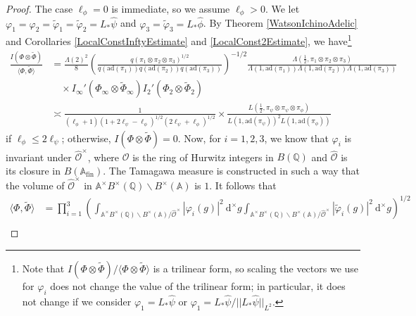 \documentclass[11pt]{amsart}
\theoremstyle{definition}
\begin{document}
\begin{proof} 
The case $\ell_{\phi}=0$ is immediate, so we assume $\ell_{\phi}>0$. We let $\varphi_1 = \varphi_2 = \widetilde{\varphi}_1 = \widetilde{\varphi}_2 = L_{*}\widehat{\psi}$ and $\varphi_3 = \widetilde{\varphi}_3 = L_{*}\widehat{\phi}$. By Theorem \ref{WatsonIchinoAdelic} and Corollaries \ref{LocalConstInftyEstimate} and \ref{LocalConst2Estimate}, we have\footnote{Note that $I(\Phi \otimes \widetilde{\Phi})/\langle \Phi \otimes \widetilde{\Phi}\rangle$ is a trilinear form, so scaling the vectors we use for $\varphi_i$ does not change the value of the trilinear form; in particular, it does not change if we consider $\varphi_1 = L_{*}\widehat{\psi}$ or $\varphi_1 = L_{*}\widehat{\psi} / ||L_{*}\widehat{\psi}||_{L^2}$.}
\begin{align}
    \frac{I(\Phi \otimes \widetilde{\Phi})}{\langle \Phi, \widetilde{\Phi} \rangle} &= \frac{\Lambda(2)^2}{8} \left( \frac{q(\pi_1 \otimes \pi_2 \otimes \pi_3)^{1/2}}{q(\mathrm{ad}(\pi_1)) q(\mathrm{ad}(\pi_2)) q(\mathrm{ad}(\pi_3))} \right)^{-1/2} \frac{\Lambda(\frac{1}{2}, \pi_1 \otimes \pi_2 \otimes \pi_3)}{\Lambda(1, \mathrm{ad}(\pi_1)) \Lambda(1, \mathrm{ad}(\pi_2)) \Lambda(1, \mathrm{ad}(\pi_3))} \label{WatsonIchinoClassical-eq1} \\
    &\quad \times I_{\infty}'(\Phi_{\infty} \otimes \widetilde{\Phi}_{\infty}) I_{2}'(\Phi_{2} \otimes \widetilde{\Phi}_{2}) \nonumber \\
    &\asymp \frac{1}{(\ell_{\phi}+1) (1+2\ell_{\psi} - \ell_{\phi})^{1/2}(2\ell_{\psi} + \ell_{\phi})^{1/2}} \times \frac{L(\frac{1}{2}, \pi_{\psi} \otimes \pi_{\psi} \otimes \pi_{\phi})}{L(1, \mathrm{ad}(\pi_{\psi}))^2 L(1, \mathrm{ad}(\pi_{\phi}))} \nonumber
\end{align} 
if $\ell_{\phi} \leq 2\ell_{\psi}$; otherwise, $I(\Phi \otimes \widetilde{\Phi})=0$. Now, for $i=1,2,3$, we know that $\varphi_i$ is invariant under $\widehat{\mathcal{O}}^{\times}$, where $\mathcal{O}$ is the ring of Hurwitz integers in $B(\mathbb{Q})$ and $\widehat{\mathcal{O}}$ is its closure in $B(\mathbb{A}_{\text{fin}})$. The Tamagawa measure is constructed in such a way that the volume of $\widehat{\mathcal{O}}^{\times}$ in $\mathbb{A}^{\times} B^{\times}(\mathbb{Q}) \backslash B^{\times}(\mathbb{A})$ is $1$. It follows that 
\begin{align*}
    \langle \Phi, \widetilde{\Phi} \rangle &= \prod_{i=1}^{3} \left( \int_{\mathbb{A}^{\times} B^{\times}(\mathbb{Q}) \backslash B^{\times}(\mathbb{A}) / \widehat{\mathcal{O}}^{\times}} |\varphi_{i}(g)|^2 \: \mathrm{d}^{\times}g \int_{\mathbb{A}^{\times} B^{\times}(\mathbb{Q}) \backslash B^{\times}(\mathbb{A}) / \widehat{\mathcal{O}}^{\times}} |\widetilde{\varphi}_{i}(g)|^2 \: \mathrm{d}^{\times}g \right)^{1/2} \\

\end{align*}
\end{proof}
\end{document}
